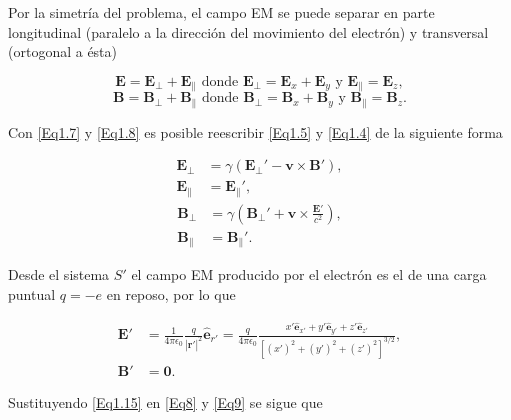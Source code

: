 \documentclass[a4paper,10pt]{article}
\begin{document}
Por la simetría del problema, el campo EM se puede separar en parte longitudinal (paralelo a la dirección del movimiento del electrón) y transversal (ortogonal a ésta)

\begin{equation}
\textbf{E}				=\textbf{E}_{\bot}+\textbf{E}_{\|}	\text{	donde	}
\textbf{E}_{\bot}	=\textbf{E}_x+\textbf{E}_y				\text{	y	}
\textbf{E}_{\|}		=\textbf{E}_z,
\label{Eq1.7}
\end{equation}
\begin{equation}
\textbf{B}				=\textbf{B}_{\bot}+\textbf{B}_{\|}	\text{	donde	}
\textbf{B}_{\bot}	=\textbf{B}_x+\textbf{B}_y				\text{	y	}
\textbf{B}_{\|}		=\textbf{B}_z.
\label{Eq1.8}
\end{equation}

Con \eqref{Eq1.7} y \eqref{Eq1.8} es posible reescribir \eqref{Eq1.5} y \eqref{Eq1.4} de la siguiente forma

\begin{subequations}
\begin{align}
\textbf{E}_{\bot}	&=\gamma(\textbf{E}_{\bot}'-\textbf{v}\times\textbf{B}'), \\
\textbf{E}_{\|}		&=\textbf{E}_{\|}',
\end{align}
\label{Eq1.9}
\end{subequations}
\begin{subequations}
\begin{align}
\textbf{B}_{\bot}	&=\gamma(\textbf{B}_{\bot}'+\textbf{v}\times\frac{\textbf{E}'}{c^2}),	\\
\textbf{B}_{\|}		&=\textbf{B}_{\|}'.
\end{align}
\label{Eq1.10}
\end{subequations}

Desde el sistema $S'$ el campo EM producido por el electrón es el de una carga puntual $q=-e$ en reposo, por lo que

\begin{subequations}
\begin{align}
\textbf{E}'		&=\frac{1}{4\pi \epsilon_0}\frac{q}{|\textbf{r} '|^2}\hat{\textbf{e}}_{r'}=\frac{q}{4\pi \epsilon_0}\frac{x'\hat{\textbf{e}}_{x'}+y'\hat{\textbf{e}}_{y'}+z'\hat{\textbf{e}}_{z'}}{[(x')^2+(y')^2+(z')^2]^{3/2}}, \\
\textbf{B}'		&=\textbf{0}.
\end{align}
\label{Eq1.11}
\end{subequations}

Sustituyendo \eqref{Eq1.15} en \eqref{Eq8} y \eqref{Eq9} se sigue que
\end{document}

